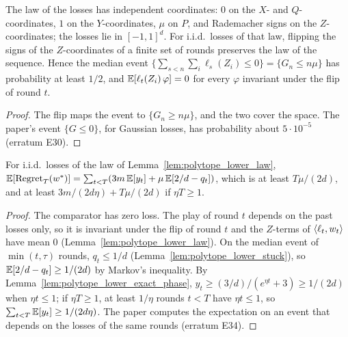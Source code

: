\begin{lemma}
  \label{lem:polytope_lower_law}
  \leanok
  The law of the losses has independent coordinates: $0$ on the $X$- and $Q$-coordinates, $1$ on
  the $Y$-coordinates, $\mu$ on $P$, and Rademacher signs on the $Z$-coordinates; the losses lie in
  $[-1, 1]^d$. For i.i.d.\ losses of that law, flipping the signs of the $Z$-coordinates of a finite
  set of rounds preserves the law of the sequence. Hence the median event
  $\{\sum_{s<n}\sum_i\ell_s(Z_i) \le 0\} = \{G_n \le n\mu\}$ has probability at least $1/2$, and
  $\mathbb{E}[\ell_t(Z_i)\,\varphi] = 0$ for every $\varphi$ invariant under the flip of round $t$.
\end{lemma}

\begin{proof}
  \leanok
  The flip maps the event to $\{G_n \ge n\mu\}$, and the two cover the space. The paper's event
  $\{G \le 0\}$, for Gaussian losses, has probability about $5\cdot10^{-5}$ (erratum E30).
\end{proof}

\begin{lemma}
  \label{lem:polytope_lower_expected_regret}
  \leanok
  For i.i.d.\ losses of the law of Lemma~\ref{lem:polytope_lower_law},
  $\mathbb{E}[\mathrm{Regret}_T(w^*)] = \sum_{t<T}(3m\,\mathbb{E}[y_t] + \mu\,\mathbb{E}[2/d - q_t])$, which is at least
  $T\mu/(2d)$, and at least $3m/(2d\eta) + T\mu/(2d)$ if $\eta T \ge 1$.
\end{lemma}

\begin{proof}
  \leanok
  The comparator has zero loss. The play of round $t$ depends on the past losses only, so it is
  invariant under the flip of round $t$ and the $Z$-terms of $\langle \ell_t, w_t \rangle$ have mean $0$
  (Lemma~\ref{lem:polytope_lower_law}). On the median event of $\min(t, \tau)$ rounds, $q_t \le 1/d$
  (Lemma~\ref{lem:polytope_lower_stuck}), so $\mathbb{E}[2/d - q_t] \ge 1/(2d)$ by Markov's inequality. By
  Lemma~\ref{lem:polytope_lower_exact_phase}, $y_t \ge (3/d)/(e^{\eta t} + 3) \ge 1/(2d)$ when
  $\eta t \le 1$; if $\eta T \ge 1$, at least $1/\eta$ rounds $t < T$ have $\eta t \le 1$, so
  $\sum_{t<T}\mathbb{E}[y_t] \ge 1/(2d\eta)$. The paper computes the
  expectation on an event that depends on the losses of the same rounds (erratum E34).
\end{proof}

